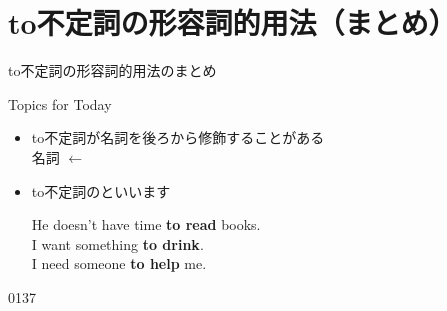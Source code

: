 \documentclass[aspectratio=169,xcolor={dvipsnames,table}]{beamer}
\begin{document}
\section{to不定詞の形容詞的用法（まとめ）}
\begin{frame}[plain]{to不定詞の形容詞的用法のまとめ}
 
\begin{block}{Topics for Today}
\begin{itemize}[square]\small
 \item to不定詞が名詞を後ろから修飾することがある\\
\hfill\hfill{}名詞 $\longleftarrow$ \hfill~
 \item to不定詞のといいます


\hfill{}{\scriptsize He doesn't have time \textbf{to read} books.}\\
\hfill{}{\scriptsize I want something \textbf{to drink}.}\\
\hfill{}{\scriptsize I need someone \textbf{to help} me.}

 \end{itemize}
     \end{block}
\hfill{\tiny 0137}\,{\scriptsize {}}\

\end{frame}
\end{document}

